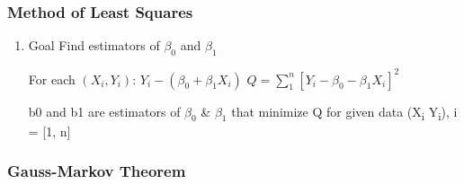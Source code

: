 \documentclass[11pt]{article}
\begin{document}
\subsubsection{Method of Least Squares}
\label{sec:org68bf4d1}
\begin{enumerate}
\item Goal
\label{sec:orgf9c876e}
Find estimators of \(\beta_0\) and \(\beta_1\)

For each \((X_i, Y_i)\): \(Y_i - (\beta_0 + \beta_1 X_i)\)
\(Q = \sum_{1}^{n} [ Y_i - \beta_0 - \beta_1 X_i ]^2\)

b0 and b1 are estimators of \(\beta_0\) \& \(\beta_1\) that minimize Q for given data
(X\textsubscript{i} Y\textsubscript{i}), i = [1, n]
\end{enumerate}
\subsubsection{Gauss-Markov Theorem}
\label{sec:org2b9aeef}
\end{document}
